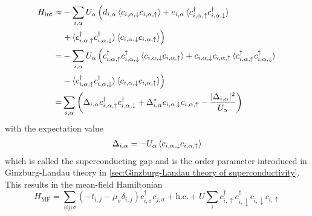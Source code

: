 \documentclass[../notes.tex]{subfiles}
\begin{document}
\begin{align}
	H_{\mathrm{int}} \approx &-\sum_{i, \alpha} U_{\alpha} \left(
	d_{i, \alpha} \braket{c_{i, \alpha, \downarrow} c_{i, \alpha, \uparrow}}
	+ e_{i, \alpha} \braket{c_{i, \alpha, \uparrow}^{\dagger} c_{i, \alpha, \downarrow}^{\dagger}} \right. \nonumber \\
	&\left.+ \braket{c_{i, \alpha, \uparrow}^{\dagger} c_{i, \alpha, \downarrow}^{\dagger}} \braket{c_{i, \alpha, \downarrow} c_{i, \alpha, \uparrow}}
	\right) \\
	= &-\sum_{i, \alpha} U_{\alpha} \left(
		c_{i, \alpha, \uparrow}^{\dagger} c_{i, \alpha, \downarrow}^{\dagger} \braket{c_{i, \alpha, \downarrow} c_{i, \alpha, \uparrow}}
		+ c_{i, \alpha, \downarrow} c_{i, \alpha, \uparrow} \braket{c_{i, \alpha, \uparrow}^{\dagger} c_{i, \alpha, \downarrow}^{\dagger}} \right. \nonumber \\
	&\left.- \braket{c_{i, \alpha, \uparrow}^{\dagger} c_{i, \alpha, \downarrow}^{\dagger}} \braket{c_{i, \alpha, \downarrow} c_{i, \alpha, \uparrow}} \right) \\
	= &\sum_{i, \alpha} \left(\Delta_{i, \alpha} c_{i, \alpha, \uparrow}^{\dagger} c_{i, \alpha, \downarrow}^{\dagger} + \Delta_{i, \alpha}^{*} c_{i, \alpha, \downarrow} c_{i, \alpha, \uparrow} - \frac{\vert \Delta_{i, \alpha} \vert^2}{U_{\alpha}}\right)
\end{align}
with the expectation value
\begin{align}
	\Delta_{i, \alpha} = -U_{\alpha} \braket{c_{i, \alpha, \downarrow} c_{i, \alpha, \uparrow}}
\end{align}
which is called the superconducting gap and is the order parameter introduced in Ginzburg-Landau theory in \cref{sec:Ginzburg-Landau theory of superconductivity}.
This results in the mean-field Hamiltonian 
\begin{equation}
	H_{\mathrm{MF}} = \sum_{\langle i j \rangle \sigma} \left(-t_{i, j} - \mu_{\sigma} \delta_{i, j}\right) c_{i, \sigma}^{\dagger} c_{j, \sigma} + \mathrm{h.c.} + U \sum_{i} c_{i, \uparrow}^{\dagger} c_{i, \downarrow}^{\dagger} c_{i, \downarrow} c_{i, \uparrow}
\end{equation}
\end{document}
